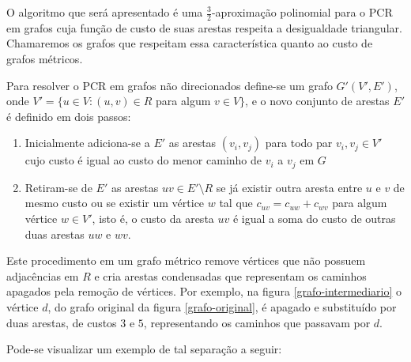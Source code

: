         O algoritmo que será apresentado é uma $\frac{3}{2}$-aproximação polinomial para o PCR em grafos cuja função de custo de suas arestas respeita a desigualdade triangular.
        Chamaremos os grafos que respeitam essa característica quanto ao custo de grafos métricos.

        Para resolver o PCR em grafos não direcionados define-se um grafo $G'(V', E')$, onde $V' = \{ u \in V : (u, v) \in R$ para algum $v \in V\}$, e o novo conjunto de arestas $E'$ é definido em dois passos:
        
        \begin{enumerate}
            \item Inicialmente adiciona-se a $E'$ as arestas $(v_i, v_j)$ para todo par $v_i, v_j \in V'$ cujo custo é igual ao custo do menor caminho de $v_i$ a $v_j$ em $G$
            \item Retiram-se de $E'$ as arestas $uv \in E' \setminus R$ se já existir outra aresta entre $u$ e $v$ de mesmo custo ou se existir um vértice $w$ tal que $c_{uv} = c_{uw} + c_{wv}$ para algum vértice $w \in V'$, isto é, o custo da aresta $uv$ é igual a soma do custo de outras duas arestas $uw$ e $wv$.
        \end{enumerate}

        Este procedimento em um grafo métrico remove vértices que não possuem adjacências em $R$ e cria arestas condensadas que representam os caminhos apagados pela remoção de vértices. 
        Por exemplo, na figura \ref{grafo-intermediario} o vértice $d$, do grafo original da figura \ref{grafo-original}, é apagado e substituído por duas arestas, de custos $3$ e $5$, representando os caminhos que passavam por $d$.

        Pode-se visualizar um exemplo de tal separação a seguir:

